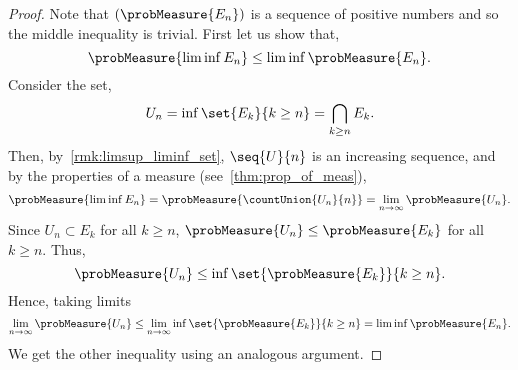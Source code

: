 \begin{proof}
    Note that $(\probMeasure{E_n})$ is a sequence of positive numbers and so the middle inequality
    is trivial. First let us show that,
    \[\probMeasure{\liminf E_n} \leq \liminf \probMeasure{E_n}.\]
    Consider the set,
    \[U_n = \inf\set{E_k}{k\geq n} = \bigcap\limits_{k\geq n}E_k.\]
    Then, by~\ref{rmk:limsup_liminf_set}, $\seq{U}{n}$ is an increasing sequence, and by the properties
    of a measure (see~\ref{thm:prop_of_meas}),
    \[\probMeasure{\liminf E_n} = \probMeasure{\countUnion{U_n}{n}}
	=\lim\limits_{n\to\infty}\probMeasure{U_n}.\]
    Since $U_n \subset E_k$ for all $k \geq n$, $\probMeasure{U_n} \leq \probMeasure{E_k}$ for all
    $k\geq n$. Thus,
    \[\probMeasure{U_n} \leq \inf\set{\probMeasure{E_k}}{k\geq n}.\]
    Hence, taking limits
    \[\lim\limits_{n\to\infty} \probMeasure{U_n} \leq
	\lim\limits_{n\to\infty}\inf\set{\probMeasure{E_k}}{k\geq n} = \liminf\probMeasure{E_n}.\]
    We get the other inequality using an analogous argument.
\end{proof}

